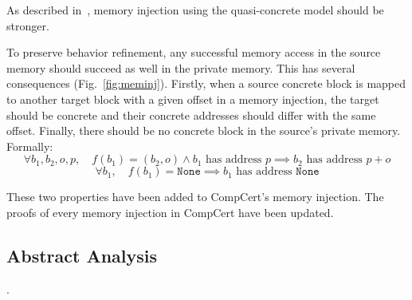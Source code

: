 As described in~\cite{DBLP:conf/pldi/KangHMGZV15}, memory injection using the quasi-concrete model should be stronger.

To preserve behavior refinement, any successful memory access in the source memory should succeed as well in the private memory. This has several consequences (Fig.~\ref{fig:meminj}).
Firstly, when a source concrete block is mapped to another target block with a given offset in a memory injection, the target should be concrete and their concrete addresses should differ with the same offset.
Finally, there should be no concrete block in the source's private memory.
Formally:
$$\forall b_1,b_2,o,p,\quad f(b_1)=(b_2,o)\wedge b_1\text{ has address }p\implies b_2\text{ has address }p+o$$
$$\forall b_1,\quad f(b_1)=\texttt{None}\implies b_1\text{ has address }\texttt{None}$$

These two properties have been added to CompCert's memory injection. The proofs of every memory injection in CompCert have been updated. 

\subsection{Abstract Analysis}
.
